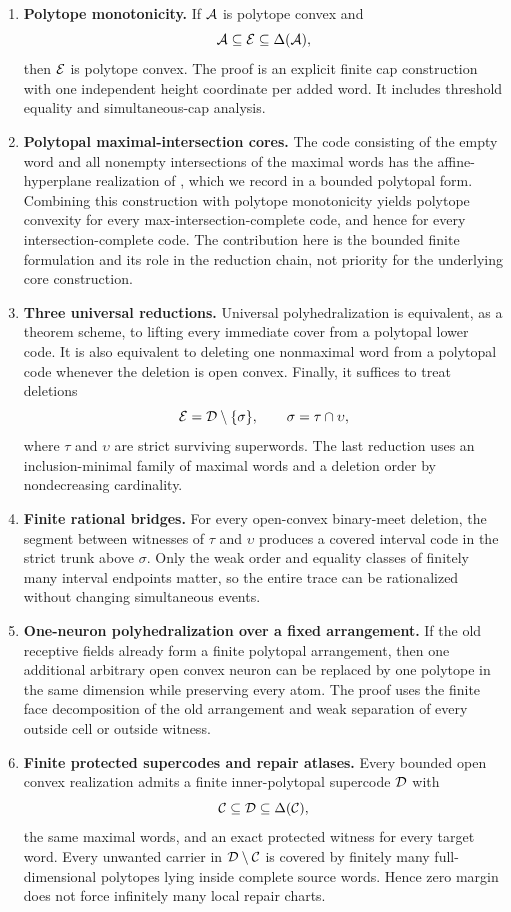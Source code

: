 \begin{enumerate}[label=\textup{(\roman*)},leftmargin=2.5em]
\item \textbf{Polytope monotonicity.}  If $\mathcal A$ is polytope convex and
\[
 \mathcal A\subseteq\mathcal E\subseteq\Delta(\mathcal A),
\]
then $\mathcal E$ is polytope convex.  The proof is an explicit finite cap construction with one independent height coordinate per added word.  It includes threshold equality and simultaneous-cap analysis.

\item \textbf{Polytopal maximal-intersection cores.}  The code consisting of the empty word and all nonempty intersections of the maximal words has the affine-hyperplane realization of \citet{CruzEtAl2019}, which we record in a bounded polytopal form.  Combining this construction with polytope monotonicity yields polytope convexity for every max-intersection-complete code, and hence for every intersection-complete code.  The contribution here is the bounded finite formulation and its role in the reduction chain, not priority for the underlying core construction.

\item \textbf{Three universal reductions.}  Universal polyhedralization is equivalent, as a theorem scheme, to lifting every immediate cover from a polytopal lower code.  It is also equivalent to deleting one nonmaximal word from a polytopal code whenever the deletion is open convex.  Finally, it suffices to treat deletions
\[
 \mathcal E=\mathcal D\setminus\{\sigma\},\qquad \sigma=\tau\cap\upsilon,
\]
where $\tau$ and $\upsilon$ are strict surviving superwords.  The last reduction uses an inclusion-minimal family of maximal words and a deletion order by nondecreasing cardinality.

\item \textbf{Finite rational bridges.}  For every open-convex binary-meet deletion, the segment between witnesses of $\tau$ and $\upsilon$ produces a covered interval code in the strict trunk above $\sigma$.  Only the weak order and equality classes of finitely many interval endpoints matter, so the entire trace can be rationalized without changing simultaneous events.

\item \textbf{One-neuron polyhedralization over a fixed arrangement.}  If the old receptive fields already form a finite polytopal arrangement, then one additional arbitrary open convex neuron can be replaced by one polytope in the same dimension while preserving every atom.  The proof uses the finite face decomposition of the old arrangement and weak separation of every outside cell or outside witness.

\item \textbf{Finite protected supercodes and repair atlases.}  Every bounded open convex realization admits a finite inner-polytopal supercode $\mathcal D$ with
\[
 \mathcal C\subseteq\mathcal D\subseteq\Delta(\mathcal C),
\]
the same maximal words, and an exact protected witness for every target word.  Every unwanted carrier in $\mathcal D\setminus\mathcal C$ is covered by finitely many full-dimensional polytopes lying inside complete source words.  Hence zero margin does not force infinitely many local repair charts.
\end{enumerate}

